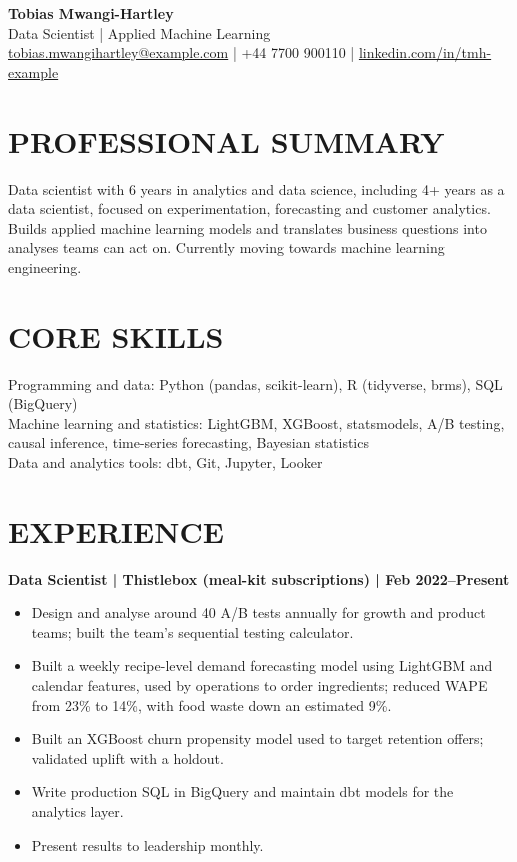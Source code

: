 \documentclass[11pt,a4paper]{article}
\begin{document}
\begin{center}
    {\Huge\bfseries\color{primarycolor} Tobias Mwangi-Hartley}\\[0.25em]
    {\large\color{accentcolor} Data Scientist | Applied Machine Learning}\\[0.35em]
    {\small \href{mailto:tobias.mwangihartley@example.com}{tobias.mwangihartley@example.com} | +44 7700 900110 | \href{https://linkedin.com/in/tmh-example}{linkedin.com/in/tmh-example}}
\end{center}

\section*{PROFESSIONAL SUMMARY}
Data scientist with 6 years in analytics and data science, including 4+ years as a data scientist, focused on experimentation, forecasting and customer analytics. Builds applied machine learning models and translates business questions into analyses teams can act on. Currently moving towards machine learning engineering.

\section*{CORE SKILLS}
Programming and data: Python (pandas, scikit-learn), R (tidyverse, brms), SQL (BigQuery)\\
Machine learning and statistics: LightGBM, XGBoost, statsmodels, A/B testing, causal inference, time-series forecasting, Bayesian statistics\\
Data and analytics tools: dbt, Git, Jupyter, Looker

\section*{EXPERIENCE}
\textbf{Data Scientist | Thistlebox (meal-kit subscriptions) | Feb 2022–Present}
\begin{itemize}
    \item Design and analyse around 40 A/B tests annually for growth and product teams; built the team's sequential testing calculator.
    \item Built a weekly recipe-level demand forecasting model using LightGBM and calendar features, used by operations to order ingredients; reduced WAPE from 23\% to 14\%, with food waste down an estimated 9\%.
    \item Built an XGBoost churn propensity model used to target retention offers; validated uplift with a holdout.
    \item Write production SQL in BigQuery and maintain dbt models for the analytics layer.
    \item Present results to leadership monthly.
\end{itemize}
\end{document}
